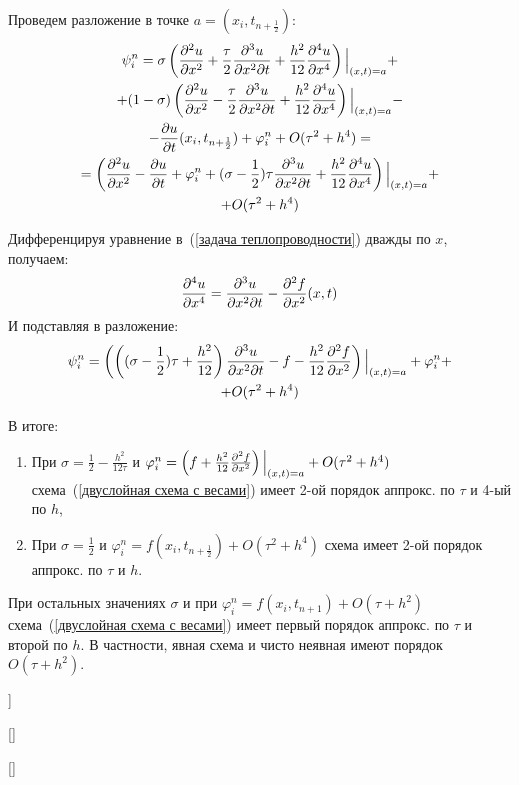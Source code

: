 \begin{Commentwhite}
\newcommand*{\point}{\ensuremath{(x_i,t_{n+\frac{1}{2}})}}
Проведем разложение в точке $a=\point$:
\begin{gather*}
    \psi_i^n = \sigma\left( \deltwo{u}{x} + \frac{\tau}{2}\frac{\partial^3 u}{\partial x^2 \partial t} + \frac{h^2}{12}\deln{u}{x}{4} \right)\Big|_{(x,t)=a} + 
    \\
    + (1 - \sigma)\left( \deltwo{u}{x} - \frac{\tau}{2}\frac{\partial^3 u}{\partial x^2 \partial t} + \frac{h^2}{12}\deln{u}{x}{4} \right)\Big|_{(x,t)=a} -
    \\
    - \del{u}{t}\point + \varphi_i^n + O(\tau^2 + h^4) = 
    \\
    = \left(\deltwo{u}{x} - \del{u}{t} + \varphi_i^n + (\sigma - \frac{1}{2})\tau\frac{\partial^3 u}{\partial x^2 \partial t} + \frac{h^2}{12}\deln{u}{x}{4}\right)\Big|_{(x,t)=a} + 
    \\
    + O(\tau^2 + h^4)
\end{gather*}

Дифференцируя уравнение в~(\ref{задача теплопроводности}) дважды по $x$, получаем:
$$\frac{\partial^{4} u}{\partial x^{4}} = \frac{\partial^3 u}{\partial x^2 \partial t} - \frac{\partial^2 f}{\partial x^2}(x,t)$$
И подставляя в разложение:
\begin{gather*}
    \psi_i^n = \left( \left((\sigma - \frac{1}{2})\tau + \frac{h^2}{12}\right)\frac{\partial^3 u}{\partial x^2 \partial t} - f -\frac{h^2}{12}\frac{\partial^2 f}{\partial x^2} \right)\Big|_{(x,t)=a} + \varphi_i^n +
    \\
    + O(\tau^2 + h^4)
\end{gather*}

В итоге:
\begin{enumerate}
    \item При $\sigma = \frac{1}{2} - \frac{h^2}{12\tau}$ и $\varphi_i^n = \left(f + \frac{h^2}{12}\frac{\partial^2 f}{\partial x^2}\right)\Big|_{(x,t)=a} + O(\tau^2 + h^4)$ схема~(\ref{двуслойная схема с весами}) имеет 2-ой порядок аппрокс. по $\tau$ и 4-ый по $h$,
    \item При $\sigma = \frac{1}{2}$ и $\varphi_i^n = f\point + O(\tau^2 + h^4)$ схема имеет 2-ой порядок аппрокс. по $\tau$ и $h$.
\end{enumerate}

При остальных значениях $\sigma$ и при $\varphi_i^n = f(x_i, t_{n+1}) + O(\tau + h^2)$ схема~(\ref{двуслойная схема с весами}) имеет первый порядок аппрокс. по $\tau$ и второй по $h$. В частности, явная схема и чисто неявная имеют порядок $O(\tau + h^2)$.
\end{Commentwhite}


\bigbreak
[\cite[41-42]{chmmf}]

[\cite[272-273, 276-279]{Samarski}]

[\cite[259-261]{tickets2022}]
